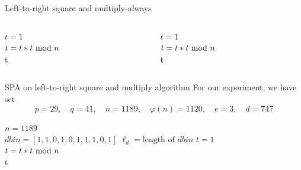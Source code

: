 \begin{frame}{Left-to-right square and multiply-always}
    \begin{columns}[T] %
\begin{column}{.5\textwidth}
{
\setlength{\interspacetitleruled}{0pt}%
\setlength{\algotitleheightrule}{0pt}%
\begin{algorithm}[H]
$t = 1$\\
 	{
  	$t=t*t\textrm{~mod~} n$\\
  	}
  	\Return t
\end{algorithm}
}
\end{column}%
\begin{column}{.55\textwidth}
{\small
 \begin{algorithm}[H]
$t = 1$\\
 	{
  	$t=t*t\textrm{~mod~} n$\\
  	}
  	\Return t
	\caption{Square and multiply-always}
\end{algorithm}}
\end{column}%
\end{columns}
\end{frame}

\begin{frame}{SPA on left-to-right square and multiply algorithm}
For our experiment, we have set
        \[
        p=29,\quad q=41,\quad n=1189,\quad \varphi(n)=1120,\quad e=3,\quad d=747
        \]
{\small
\begin{algorithm}[H]
$n=1189$\\
$dbin=[1,1,0,1,0,1,1,1,0,1]$
$\ell_d=\text{length of }dbin$
$t = 1$\\
 	{
  	$t=t*t\textrm{~mod~} n$\\
  	}
  	\Return t
\caption{Left-to-right square and multiply algorithm for computing modular exponentiation with parameters from above.}
\end{algorithm}}
\end{frame}

